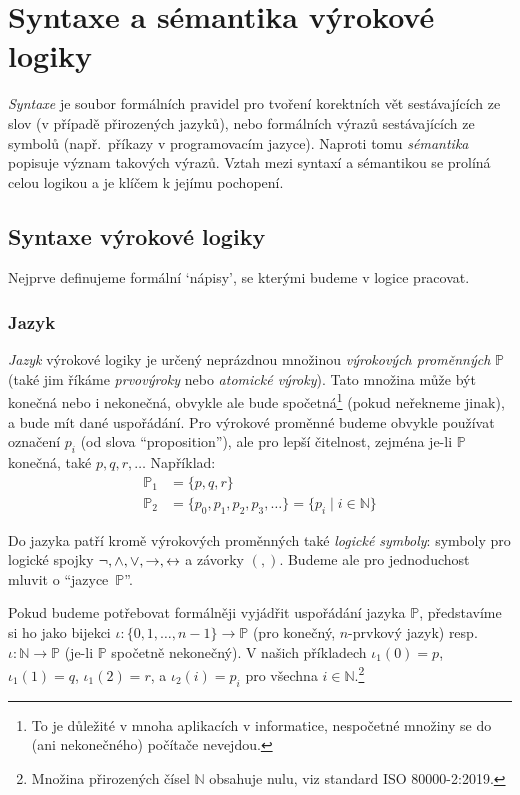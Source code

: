 \chapter{Syntaxe a sémantika výrokové logiky}

\emph{Syntaxe} je soubor formálních pravidel pro tvoření korektních vět sestávajících ze slov (v případě přirozených jazyků), nebo formálních výrazů sestávajících ze symbolů (např.\ příkazy v programovacím jazyce). Naproti tomu \emph{sémantika} popisuje význam takových výrazů. Vztah mezi syntaxí a sémantikou se prolíná celou logikou a je klíčem k jejímu pochopení.


\section{Syntaxe výrokové logiky}

Nejprve definujeme formální `nápisy', se kterými budeme v logice pracovat.


\subsection{Jazyk}

\emph{Jazyk} výrokové logiky je určený neprázdnou množinou \emph{výrokových proměnných} \( \mathbb P \) (také jim říkáme \emph{prvovýroky} nebo \emph{atomické výroky}). Tato množina může být konečná nebo i nekonečná, obvykle ale bude spočetná\footnote{To je důležité v mnoha aplikacích v informatice, nespočetné množiny se do (ani nekonečného) počítače nevejdou.} (pokud neřekneme jinak), a bude mít dané uspořádání. Pro výrokové proměnné budeme obvykle používat označení \( p_i\) (od slova ``proposition''), ale pro lepší čitelnost, zejména je-li \( \mathbb P \) konečná, také \(p,q,r,\dots \) Například:
\begin{align*}
    \mathbb P_1 &= \{ p, q, r\}\\
    \mathbb P_2 &= \{ p_0, p_1, p_2, p_3, \ldots \} = \{ p_i \mid i \in \mathbb N \}
\end{align*}

Do jazyka patří kromě výrokových proměnných také \emph{logické symboly}: symboly pro logické spojky \( \neg,{\land},{\lor}, {\mathbin{\rightarrow}}, {\mathbin{\leftrightarrow}} \) a závorky \( (,) \). Budeme ale pro jednoduchost mluvit o ``jazyce~\( \mathbb P \)''.

\begin{remark}\label{remark:order-of-language}
Pokud budeme potřebovat formálněji vyjádřit uspořádání jazyka $\mathbb P$, představíme si ho jako bijekci $\iota\colon\{0,1,\dots,n-1\}\to \mathbb P$ (pro konečný, $n$-prvkový jazyk) resp.\ $\iota\colon\mathbb N\to \mathbb P$ (je-li $\mathbb P$ spočetně nekonečný). V našich příkladech $\iota_1(0)=p$, $\iota_1(1)=q$, $\iota_1(2)=r$, a $\iota_2(i)=p_i$ pro všechna $i\in\mathbb N$.\footnote{Množina přirozených čísel $\mathbb N$ obsahuje nulu, viz standard ISO 80000-2:2019.}
\end{remark}


